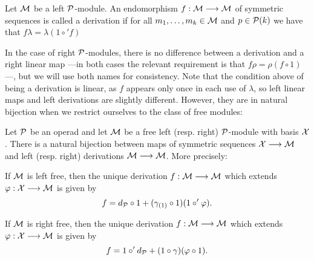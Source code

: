 \begin{definition}
Let $\mathcal M$ be a left ${\mathcal{P}}$-module. An endomorphism
$f: \mathcal M \longrightarrow \mathcal M$ of symmetric sequences is
called a derivation if for all $m_1,\ldots,m_k\in\mathcal M$
and $p\in{\mathcal{P}}(k)$ we have that $f \lambda = \lambda(1\circ' f)$
\end{definition}
 
In the case of right ${\mathcal{P}}$-modules, there is no difference
between a derivation and a right linear map ---in both cases
the relevant requirement is that $f\rho = \rho(f\circ 1)$---, but we will use
both names for consistency. Note that the condition above of
being a derivation is linear, as $f$ appears only once in each
use of $\lambda$, so left linear maps and left derivations
are slightly different. However, they are in natural bijection
when we restrict ourselves to the class of free modules:

\begin{lemma}\label{lemma:derivations}
Let ${\mathcal{P}}$ be an operad and let $\mathcal M$ be a free
left (resp. right) ${\mathcal{P}}$-module with basis $\mathcal{X}$.
There is a natural bijection between maps of 
symmetric sequences $\mathcal{X}\longrightarrow \mathcal M$
and left (resp. right) derivations $\mathcal M\longrightarrow \mathcal M$.
More precisely:
\begin{tenumerate}
\item If $\mathcal M$ is left free, then the unique derivation $f:\mathcal M\longrightarrow\mathcal M$
which extends $\varphi: \mathcal{X}\longrightarrow \mathcal M$ is given by
\[
f = d_{\mathcal{P}} \circ 1 + (\gamma_{(1)}\circ 1)(1\circ'\varphi).
\]
\item  If $\mathcal M$ is right free, then the unique derivation $f:\mathcal M\longrightarrow\mathcal M$ 
which extends $\varphi: \mathcal{X}\longrightarrow \mathcal M$ is given by
\[
f = 1\circ' d_{\mathcal{P}}  + (1\circ\gamma)(\varphi\circ 1).
\]
\end{tenumerate}
\end{lemma}

